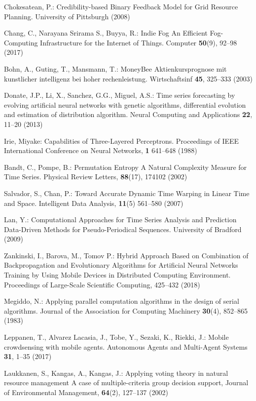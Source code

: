 \begin{thebibliography}{99.}

 Chokesatean, P.: Credibility-based Binary Feedback Model for Grid Resource Planning. University of Pittsburgh (2008)

 Chang, C., Narayana Srirama S., Buyya, R.: Indie Fog An Efficient Fog-Computing Infrastructure for the Internet of Things. Computer \textbf{50}(9), 92--98 (2017)

 Bohn, A., Guting, T., Mansmann, T.: MoneyBee Aktienkursprognose mit kunstlicher intelligenz bei hoher rechenleistung. Wirtschaftsinf \textbf{45}, 325--333 (2003)

 Donate, J.P., Li, X., Sanchez, G.G., Miguel, A.S.: Time series forecasting by evolving artificial neural networks with genetic algorithms, differential evolution and estimation of distribution algorithm. Neural Computing and Applications \textbf{22}, 11--20 (2013)

 Irie, Miyake: Capabilities of Three-Layered Perceptrons. Proceedings of IEEE International Conference on Neural Networks, \textbf{1} 641--648 (1988)

 Bandt, C., Pompe, B.: Permutation Entropy A Natural Complexity Measure for Time Series. Physical Review Letters, \textbf{88}(17), 174102 (2002)

 Salvador, S., Chan, P.: Toward Accurate Dynamic Time Warping in Linear Time and Space. Intelligent Data Analysis, \textbf{11}(5) 561--580 (2007)

 Lan, Y.: Computational Approaches for Time Series Analysis and Prediction Data-Driven Methods for Pseudo-Periodical Sequences. University of Bradford (2009)

 Zankinski, I., Barova, M., Tomov P.: Hybrid Approach Based on Combination of Backpropagation and Evolutionary Algorithms for Artificial Neural Networks Training by Using Mobile Devices in Distributed Computing Environment. Proceedings of Large-Scale Scientific Computing, 425--432 (2018)

 Megiddo, N.: Applying parallel computation algorithms in the design of serial algorithms. Journal of the Association for Computing Machinery \textbf{30}(4), 852--865 (1983)

 Leppanen, T., Alvarez Lacasia, J., Tobe, Y., Sezaki, K., Riekki, J.: Mobile crowdsensing with mobile agents. Autonomous Agents and Multi-Agent Systems \textbf{31}, 1--35 (2017)

 Laukkanen, S., Kangas, A., Kangas, J.: Applying voting theory in natural resource management A case of multiple-criteria group decision support, Journal of Environmental Management, \textbf{64}(2), 127--137 (2002)

\end{thebibliography}
